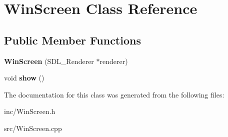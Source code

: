 \hypertarget{class_win_screen}{}\section{Win\+Screen Class Reference}
\label{class_win_screen}
\subsection*{Public Member Functions}
\begin{DoxyCompactItemize}
\item 
\mbox{\label{class_win_screen_a93903d0d543f1a0e4b30e170184d7d60}} 
{\bfseries Win\+Screen} (S\+D\+L\+\_\+\+Renderer $\ast$renderer)
\item 
\mbox{\label{class_win_screen_ae1cb7777399ae408811584ff28958393}} 
void {\bfseries show} ()
\end{DoxyCompactItemize}


The documentation for this class was generated from the following files\+:\begin{DoxyCompactItemize}
\item 
inc/Win\+Screen.\+h\item 
src/Win\+Screen.\+cpp\end{DoxyCompactItemize}
